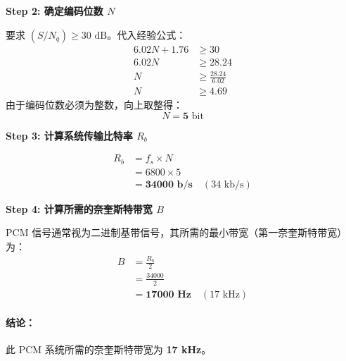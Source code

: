 \documentclass[a4paper,11pt]{ctexart}
\begin{document}
    \textbf{Step 2: 确定编码位数 $N$}
    
    要求 $(S/N_q) \ge 30 \text{ dB}$。代入经验公式：
    \begin{align*}
        6.02 N + 1.76 &\ge 30 \\
        6.02 N &\ge 28.24 \\
        N &\ge \frac{28.24}{6.02} \\
        N &\ge 4.69
    \end{align*}
    由于编码位数必须为整数，向上取整得：
    $$ N = \mathbf{5} \text{ bit} $$
    
    \textbf{Step 3: 计算系统传输比特率 $R_b$}
    
    \begin{align*}
        R_b &= f_s \times N \\
            &= 6800 \times 5 \\
            &= \mathbf{34000 \text{ b/s}} \quad (34 \text{ kb/s})
    \end{align*}
    
    \textbf{Step 4: 计算所需的奈奎斯特带宽 $B$}
    
    PCM 信号通常视为二进制基带信号，其所需的最小带宽（第一奈奎斯特带宽）为：
    \begin{align*}
        B &= \frac{R_b}{2} \\
          &= \frac{34000}{2} \\
          &= \mathbf{17000 \text{ Hz}} \quad (17 \text{ kHz})
    \end{align*}

    \paragraph{结论：}
    此 PCM 系统所需的奈奎斯特带宽为 \textbf{17 kHz}。



\vspace{2em}
\end{document}
